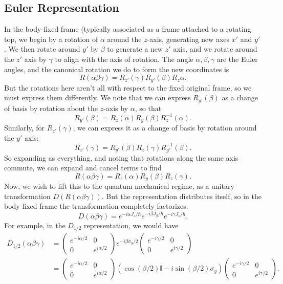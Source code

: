 \documentclass[fontsize=12pt]{scrartcl}
\newcommand{\bb}[1]{\mathbb{#1}}
\newcommand{\Id}{\bb{I}}
\begin{document}
\subsection{Euler Representation}
In the body-fixed frame (typically associated as a frame attached to a rotating top, we begin by a rotation of $\alpha$ around the $z$-axis, generating new axes $x'$ and $y'$. We then rotate around $y'$ by $\beta$ to generate a new $z'$ axis, and we rotate around the $z'$ axis by $\gamma$ to align with the axis of rotation. The angle $\alpha,\beta,\gamma$ are the Euler angles, and the canonical rotation we do to form the new coordinates is $$R(\alpha\beta\gamma)=R_{z'}(\gamma)R_{y'}(\beta)R_z{\alpha}.$$ But the rotations here aren't all with respect to the fixed original frame, so we must express them differently. We note that we can express $R_{y'}(\beta)$ as a change of basis by rotation about the $z$-axis by $\alpha$, so that $$R_{y'}(\beta)=R_z(\alpha)R_y(\beta)R_z^{-1}(\alpha).$$ Similarly, for $R_{z'}(\gamma)$, we can express it as a change of basis by rotation around the $y'$ axis: $$R_{z'}(\gamma)=R_{y'}(\beta)R_z(\gamma)R_{y'}^{-1}(\beta).$$ So expanding as everything, and noting that rotations along the same axis commute, we can expand and cancel terms to find $$R(\alpha\beta\gamma)=R_z(\alpha)R_y(\beta)R_z(\gamma).$$ Now, we wish to lift this to the quantum mechanical regime, as a unitary transformation $D(R(\alpha\beta\gamma))$. But the representation distributes itself, so in the body fixed frame the transformation completely factorizes: $$D(\alpha\beta\gamma)=e^{-i\alpha J_z/\hbar}e^{-i\beta J_y/\hbar}e^{-i\gamma J_z/\hbar}.$$ For example, in the $D_{1/2}$ representation, we would have \begin{align*}D_{1/2}(\alpha\beta\gamma)&=\left(\begin{matrix}
e^{-i\alpha/2}&0\\0&e^{i\alpha/2}
\end{matrix}\right) e^{-i\beta \sigma_y/2} \left(\begin{matrix}
e^{-i\gamma/2}&0\\0&e^{i\gamma/2}
\end{matrix}\right)\\&=\left(\begin{matrix}
e^{-i\alpha/2}&0\\0&e^{i\alpha/2}
\end{matrix}\right) \left(\cos(\beta/2)\Id - i\sin(\beta/2)\sigma_y\right)  \left(\begin{matrix}
e^{-i\gamma/2}&0\\0&e^{i\gamma/2}
\end{matrix}\right).\end{align*}
\end{document}
